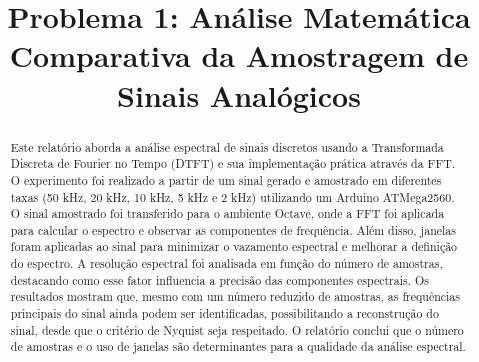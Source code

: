 \documentclass[conference]{IEEEtran}
\begin{document}
   \makeatletter
    \newcommand{\linebreakand}{%
      \end{@IEEEauthorhalign}
      \hfill\mbox{}\par
      \mbox{}\hfill\begin{@IEEEauthorhalign}
    }
    \makeatother

\title{Problema 1: Análise Matemática Comparativa da Amostragem de Sinais Analógicos\\
}

\author{
\and
{}
\IEEEauthorblockN{}
\IEEEauthorblockA{}
}

\maketitle

\begin{abstract}
Este relatório aborda a análise espectral de sinais discretos usando a Transformada Discreta de Fourier no Tempo (DTFT) e sua implementação prática através da FFT. O experimento foi realizado a partir de um sinal gerado e amostrado em diferentes taxas (50 kHz, 20 kHz, 10 kHz, 5 kHz e 2 kHz) utilizando um Arduino ATMega2560. O sinal amostrado foi transferido para o ambiente Octave, onde a FFT foi aplicada para calcular o espectro e observar as componentes de frequência. Além disso, janelas foram aplicadas ao sinal para minimizar o vazamento espectral e melhorar a definição do espectro. A resolução espectral foi analisada em função do número de amostras, destacando como esse fator influencia a precisão das componentes espectrais. Os resultados mostram que, mesmo com um número reduzido de amostras, as frequências principais do sinal ainda podem ser identificadas, possibilitando a reconstrução do sinal, desde que o critério de Nyquist seja respeitado. O relatório conclui que o número de amostras e o uso de janelas são determinantes para a qualidade da análise espectral.


\end{abstract}
\end{document}
